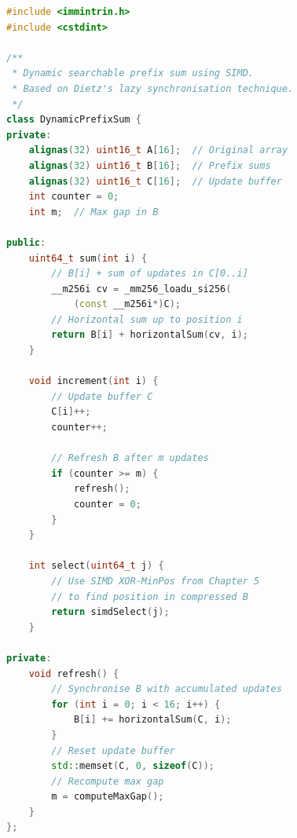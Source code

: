 \begin{lstlisting}[language=C++, caption={Dynamic prefix sum with lazy synchronisation}, label={lst:prefixsum}]
#include <immintrin.h>
#include <cstdint>

/**
 * Dynamic searchable prefix sum using SIMD.
 * Based on Dietz's lazy synchronisation technique.
 */
class DynamicPrefixSum {
private:
    alignas(32) uint16_t A[16];  // Original array
    alignas(32) uint16_t B[16];  // Prefix sums
    alignas(32) uint16_t C[16];  // Update buffer
    int counter = 0;
    int m;  // Max gap in B

public:
    uint64_t sum(int i) {
        // B[i] + sum of updates in C[0..i]
        __m256i cv = _mm256_loadu_si256(
            (const __m256i*)C);
        // Horizontal sum up to position i
        return B[i] + horizontalSum(cv, i);
    }

    void increment(int i) {
        // Update buffer C
        C[i]++;
        counter++;

        // Refresh B after m updates
        if (counter >= m) {
            refresh();
            counter = 0;
        }
    }

    int select(uint64_t j) {
        // Use SIMD XOR-MinPos from Chapter 5
        // to find position in compressed B
        return simdSelect(j);
    }

private:
    void refresh() {
        // Synchronise B with accumulated updates
        for (int i = 0; i < 16; i++) {
            B[i] += horizontalSum(C, i);
        }
        // Reset update buffer
        std::memset(C, 0, sizeof(C));
        // Recompute max gap
        m = computeMaxGap();
    }
};
\end{lstlisting}
